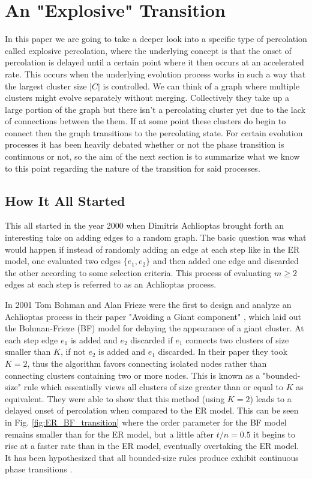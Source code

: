 \section{An "Explosive" Transition}
In this paper we are going to take a deeper look into a specific type of percolation called explosive percolation, where the underlying concept is that the onset of percolation is delayed until a certain point where it then occurs at an accelerated rate.
This occurs when the underlying evolution process works in such a way that the largest cluster size $|C|$ is controlled.
We can think of a graph where multiple clusters might evolve separately without merging.
Collectively they take up a large portion of the graph but there isn't a percolating cluster yet due to the lack of connections between the them.
If at some point these clusters do begin to connect then the graph transitions to the percolating state.
For certain evolution processes it has been heavily debated whether or not the phase transition is continuous or not, so the aim of the next section is to summarize what we know to this point regarding the nature of the transition for said processes.

\subsection{How It All Started}
This all started in the year 2000 when Dimitris Achlioptas brought forth an interesting take on adding edges to a random graph.
The basic question was what would happen if instead of randomly adding an edge at each step like in the ER model, one evaluated two edges $\{e_1, e_2\}$ and then added one edge and discarded the other according to some selection criteria.
This process of evaluating $m \ge 2$ edges at each step is referred to as an Achlioptas process.

In 2001 Tom Bohman and Alan Frieze were the first to design and analyze an Achlioptas process in their paper "Avoiding a Giant component" \cite{BF}, which laid out the Bohman-Frieze (BF) model for delaying the appearance of a giant cluster.
At each step edge $e_1$ is added and $e_2$ discarded if $e_1$ connects two clusters of size smaller than $K$, if not $e_2$ is added and $e_1$ discarded.
In their paper they took $K = 2$, thus the algorithm favors connecting isolated nodes rather than connecting clusters containing two or more nodes.
This is known as a "bounded-size" rule which essentially views all clusters of size greater than or equal to $K$ as equivalent.
They were able to show that this method (using $K = 2$) leads to a delayed onset of percolation when compared to the ER model.
This can be seen in Fig. \ref{fig:ER_BF_transition} where the order parameter for the BF model remains smaller than for the ER model, but a little after $t / n = 0.5$ it begins to rise at a faster rate than in the ER model, eventually overtaking the ER model.
It has been hypothesized that all bounded-size rules produce exhibit continuous phase transitions \cite{20070000}.

